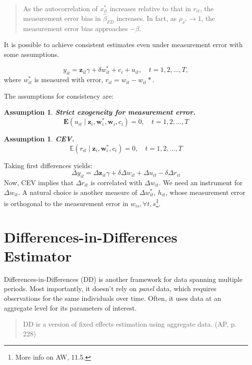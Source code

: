 \documentclass[11pt, a4paper]{report}
\theoremstyle{plain}
\newtheorem{assump}[thm]{Assumption}
\theoremstyle{plain}
\theoremstyle{remark}
\begin{document}
\begin{quote}
    As the autocorrelation of $x_{it}^*$ increases relative to that in $r_{it}$, the measurement error bias in $\hat{\beta}_{FD}$ increases. In fact, as $\rho_{x^*} \to 1$, the measurement error bias approaches $-\beta$.  
\end{quote}


It is possible to achieve consistent estimates even under measurement error with some assumptions.

\begin{equation}
    y_{i t}=\mathbf{z}_{i t} \gamma+\delta w_{i t}^{*}+c_{i}+u_{i t}, \quad t=1,2, \ldots, T,
\end{equation}
where $w_{it}^*$ is measured with error, $r_{it} = w_{it} - w_{it}*$.

The assumptions for consistency are:
\begin{assump}
    \textbf{Strict exogeneity for measurement error.} $$
    \mathbf{E}\left(u_{i t} \mid \mathbf{z}_{i}, \mathbf{w}_{i}^{*}, \mathbf{w}_{i}, c_{i}\right)=0, \quad t=1,2, \ldots, T
    $$
\end{assump}

\begin{assump}
    \textbf{CEV.} 
    $$\mathbb{E}\left(r_{i t} \mid \mathbf{z}_{i}, \mathbf{w}_{i}^{*}, c_{i}\right)=0, \quad t=1,2, \ldots, T$$
\end{assump}

Taking first differences yields:
\begin{equation}
    \Delta y_{i t}=\Delta \mathbf{z}_{i t} \gamma+\delta \Delta w_{i t}+\Delta u_{i t}-\delta \Delta r_{i t}
    \end{equation}
Now, CEV implies that $\Delta r_{it}$ is correlated with $\Delta w_{it}$. We need an instrument for $\Delta w_{it}$. A natural choice is another measure of $\Delta w_{it}^*$, $h_{it}$, whose measurement error is orthogonal to the measurement error in $w_{is}, \forall t, s$\footnote{More info on AW, 11.5.}.






\chapter{Differences-in-Differences Estimator}

Differences-in-Differences (DD) is another framework for data spanning multiple periods. Most importantly, it doesn't rely on \textit{panel} data, which requires observations for the same individuals over time. Often, it uses data at an aggregate level for its parameters of interest.
\begin{quote}
    DD is a version of fixed effects estimation using aggregate data. (AP, p. 228)
\end{quote}
\end{document}
